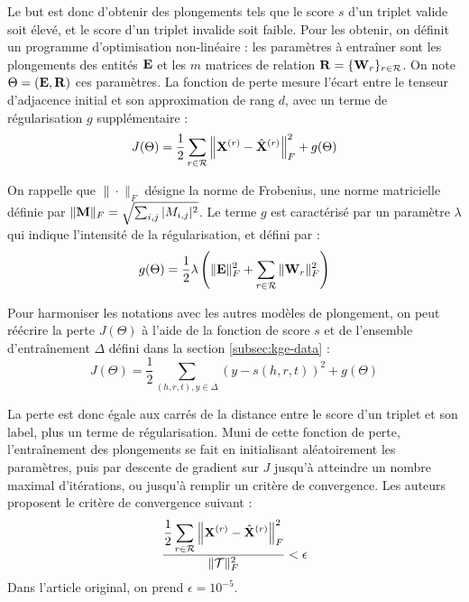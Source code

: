 Le but est donc d'obtenir des plongements tels que le score $s$ d'un triplet valide soit élevé, et le score d'un triplet invalide soit faible. Pour les obtenir, on définit un programme d'optimisation non-linéaire : les paramètres à entraîner sont les plongements des entités $\bf{E}$ et les $m$ matrices de relation $\bf{R} = \{ \bf{W}_r \}_{r \in \Rel}$. On note $\Theta = (\bf{E}, \bf{R})$ ces paramètres. La fonction de perte mesure l'écart entre le tenseur d'adjacence initial et son approximation de rang $d$, avec un terme de régularisation $g$ supplémentaire :
\begin{equation}
    J(\Theta) = \frac{1}{2} \sum_{r \in \Rel} \left\| \bf{X}^{(r)} - \hat{\bf{X}}^{(r)} \right\|_F^2 + g(\Theta)
    \label{eq:kge-rescal-loss-function}
\end{equation}

On rappelle que $\| \cdot \|_F$ désigne la norme de Frobenius, une norme matricielle définie par $\| \bf{M} \|_F = \sqrt{\sum_{i, j} |M_{i, j}|^2}$. Le terme $g$ est caractérisé par un paramètre $\lambda$ qui indique l'intensité de la régularisation, et défini par :
\begin{equation}
    g(\Theta) = \frac{1}{2} \lambda \left( \| \bf{E} \|_F^2 + \sum_{r \in \Rel} \| \bf{W}_r \|_F^2 \right)
\end{equation}


Pour harmoniser les notations avec les autres modèles de plongement, on peut réécrire la perte $J(\Theta)$ à l'aide de la fonction de score $s$ et de 
l'ensemble d'entraînement $\Delta$ défini dans la section \ref{subsec:kge-data} : %
\begin{equation}
    J(\Theta) = \frac{1}{2} \sum_{(h, r, t), y \in \Delta} \left(y - s(h, r, t) \right)^2
    + g(\Theta)
\end{equation}

La perte est donc égale aux carrés de la distance entre le score d'un triplet et son label, plus un terme de régularisation. Muni de cette fonction de perte, l'entraînement des plongements se fait en initialisant aléatoirement les paramètres, puis par descente de gradient sur $J$ jusqu'à atteindre un nombre maximal d'itérations, ou jusqu'à remplir un critère de convergence. Les auteurs \cite{rescal} proposent le critère de convergence suivant :
\begin{equation}
    \frac{\displaystyle \frac{1}{2} \sum_{r \in \Rel} \left\| \bf{X}^{(r)} - \hat{\bf{X}}^{(r)} \right\|_F^2}{\| \cal{T} \|_F^2} < \epsilon
\end{equation}
Dans l'article original, on prend $\epsilon = 10^{-5}$.


